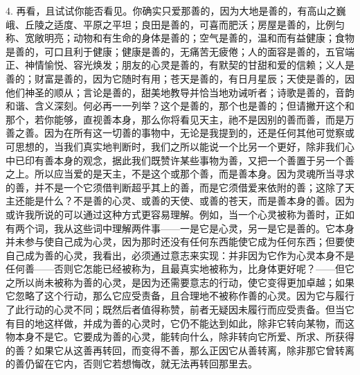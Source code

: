 4. 再看，且试试你能否看见。你确实只爱那善的，因为大地是善的，有高山之巍峨、丘陵之适度、平原之平坦；良田是善的，可喜而肥沃；房屋是善的，比例匀称、宽敞明亮；动物和有生命的身体是善的；空气是善的，温和而有益健康；食物是善的，可口且利于健康；健康是善的，无痛苦无疲倦；人的面容是善的，五官端正、神情愉悦、容光焕发；朋友的心灵是善的，有默契的甘甜和爱的信赖；义人是善的；财富是善的，因为它随时有用；苍天是善的，有日月星辰；天使是善的，因他们神圣的顺从；言论是善的，甜美地教导并恰当地劝诫听者；诗歌是善的，音韵和谐、含义深刻。何必再一一列举？这个是善的，那个也是善的；但请撇开这个和那个，若你能够，直视善本身，那么你将看见天主，祂不是因别的善而善，而是万善之善。因为在所有这一切善的事物中，无论是我提到的，还是任何其他可觉察或可思想的，当我们真实地判断时，我们之所以能说一个比另一个更好，除非我们心中已印有善本身的观念，据此我们既赞许某些事物为善，又把一个善置于另一个善之上。所以应当爱的是天主，不是这个或那个善，而是善本身。因为灵魂所当寻求的善，并不是一个它须借判断超乎其上的善，而是它须借爱来依附的善；这除了天主还能是什么？不是善的心灵、或善的天使、或善的苍天，而是善本身的善。因为或许我所说的可以通过这种方式更容易理解。例如，当一个心灵被称为善时，正如有两个词，我从这些词中理解两件事——一是它是心灵，另一是它是善的。它本身并未参与使自己成为心灵，因为那时还没有任何东西能使它成为任何东西；但要使自己成为善的心灵，我看出，必须通过意志来实现：并非因为它作为心灵本身不是任何善——否则它怎能已经被称为，且最真实地被称为，比身体更好呢？——但它之所以尚未被称为善的心灵，是因为还需要意志的行动，使它变得更加卓越；如果它忽略了这个行动，那么它应受责备，且合理地不被称作善的心灵。因为它与履行了此行动的心灵不同；既然后者值得称赞，前者无疑因未履行而应受责备。但当它有目的地这样做，并成为善的心灵时，它仍不能达到如此，除非它转向某物，而这物本身不是它。它要成为善的心灵，能转向什么，除非转向它所爱、所求、所获得的善？如果它从这善再转回，而变得不善，那么正因它从善转离，除非那它曾转离的善仍留在它内，否则它若想悔改，就无法再转回那里去。\par

